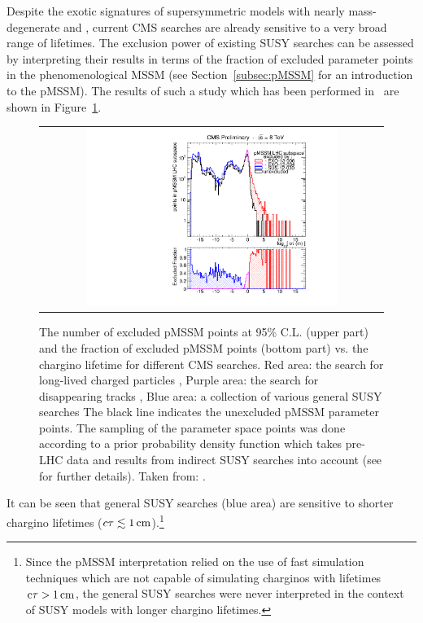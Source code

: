 Despite the exotic signatures of supersymmetric models with nearly mass-degenerate \chipm and \chiO, current CMS searches are already sensitive to a very broad range of lifetimes.
The exclusion power of existing SUSY searches can be assessed by interpreting their results in terms of the fraction of excluded parameter points in the phenomenological MSSM (see Section~\ref{subsec:pMSSM} for an introduction to the pMSSM). 
The results of such a study which has been performed in~\cite{bib:CMS:DT_8TeV} are shown in Figure~\ref{fig:pMSSMplot}. 
\begin{figure}[!b]
\vspace{20pt}
  \centering 
  \begin{tabular}{c}
    \includegraphics[width=0.75\textwidth]{figures/analysis/pMSSM_vs_ctau.pdf}
  \end{tabular}
  \caption{The number of excluded pMSSM points at 95\% C.L. (upper part) and the fraction of excluded pMSSM points (bottom part) vs. the chargino lifetime for different CMS searches.
           Red area: the search for long-lived charged particles \cite{bib:CMS:HSCP_8TeV},
           Purple area: the search for disappearing tracks  \cite{bib:CMS:DT_8TeV},
           Blue area: a collection of various general SUSY searches \cite{bib:CMS:pMSSMinterpretation_7TeV_PAS}
           The black line indicates the unexcluded pMSSM parameter points.
           The sampling of the parameter space points was done according to a prior probability density function which takes pre-LHC data and results from indirect SUSY searches into account (see \cite{bib:CMS:HSCPReinterpreation_PAS} for further details).
           Taken from: \cite{bib:pMSSMplot_source_from_DT}.}
  \label{fig:pMSSMplot}
\vspace{20pt}
\end{figure}
It can be seen that general SUSY searches (blue area) are sensitive to shorter chargino lifetimes ($c\tau \lesssim 1\,\text{cm}$).\footnote{Since the pMSSM interpretation relied on the use of fast simulation techniques which are not capable of simulating charginos with lifetimes $\text{c}\tau>1\,\text{cm}$, the general SUSY searches were never interpreted in the context of SUSY models with longer chargino lifetimes.} 
